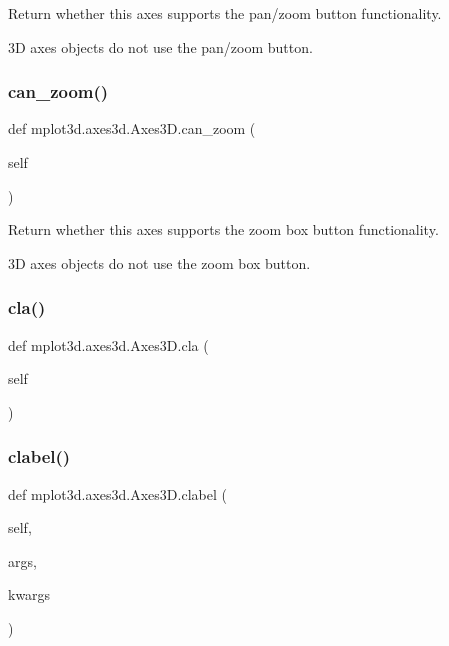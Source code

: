 \begin{DoxyVerb}Return whether this axes supports the pan/zoom button functionality.

3D axes objects do not use the pan/zoom button.
\end{DoxyVerb}
 \mbox{\label{classmplot3d_1_1axes3d_1_1Axes3D_aa68564a9243fcbe69c508e446bcfd271}} 
\subsubsection{\texorpdfstring{can\+\_\+zoom()}{can\_zoom()}}
{\footnotesize\ttfamily def mplot3d.\+axes3d.\+Axes3\+D.\+can\+\_\+zoom (\begin{DoxyParamCaption}\item[{}]{self }\end{DoxyParamCaption})}

\begin{DoxyVerb}Return whether this axes supports the zoom box button functionality.

3D axes objects do not use the zoom box button.
\end{DoxyVerb}
 \mbox{\label{classmplot3d_1_1axes3d_1_1Axes3D_ab17183aeda6f48be98ea8484ea81a3b0}} 
\subsubsection{\texorpdfstring{cla()}{cla()}}
{\footnotesize\ttfamily def mplot3d.\+axes3d.\+Axes3\+D.\+cla (\begin{DoxyParamCaption}\item[{}]{self }\end{DoxyParamCaption})}

\mbox{\label{classmplot3d_1_1axes3d_1_1Axes3D_a732e8201e873458dac2ae3b8a47aa81c}} 
\subsubsection{\texorpdfstring{clabel()}{clabel()}}
{\footnotesize\ttfamily def mplot3d.\+axes3d.\+Axes3\+D.\+clabel (\begin{DoxyParamCaption}\item[{}]{self,  }\item[{}]{args,  }\item[{}]{kwargs }\end{DoxyParamCaption})}

